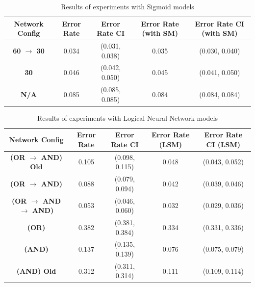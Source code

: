 \begin{table}[H]
	\begin{center}
		\begin{tabular}{| c | c | c | c | c |}
			\hline
			\textbf{Network Config} & \textbf{Error Rate} & \textbf{Error Rate CI} & \textbf{Error Rate (with SM)} & \textbf{Error Rate CI (with SM)}\\
			\hline
			\hline
			\textbf{60 $\rightarrow$ 30} & 0.034 & (0.031, 0.038) & 0.035 & (0.030, 0.040)\\
			\textbf{30} & 0.046 & (0.042, 0.050) & 0.045 & (0.041, 0.050)\\
			\textbf{N/A} & 0.085 & (0.085, 0.085) & 0.084 & (0.084, 0.084)\\
			\hline
		\end{tabular}
	\end{center}
	\caption{Results of experiments with Sigmoid models}
	\label{tab:mnist-sigmoid-peformance-results}
\end{table}

\begin{table}[H]
	\begin{center}
		\begin{tabular}{| c | c | c | c | c |}
			\hline
			\textbf{Network Config} & \textbf{Error Rate} & \textbf{Error Rate CI} & \textbf{Error Rate (LSM)} & \textbf{Error Rate CI (LSM)}\\
			\hline
			\hline
			\textbf{(OR $\rightarrow$ AND) Old } & 0.105 & (0.098, 0.115) & 0.048 & (0.043, 0.052)\\
			\textbf{(OR $\rightarrow$ AND) } & 0.088 & (0.079, 0.094) & 0.042 & (0.039, 0.046)\\
			\textbf{(OR $\rightarrow$ AND $\rightarrow$ AND) } & 0.053 & (0.046, 0.060) & 0.032 & (0.029, 0.036)\\
			\textbf{(OR) } & 0.382 & (0.381, 0.384) & 0.334 & (0.331, 0.336)\\
			\textbf{(AND) } & 0.137 & (0.135, 0.139) & 0.076 & (0.075, 0.079)\\
			\textbf{(AND) Old} & 0.312 & (0.311, 0.314) & 0.111 & (0.109, 0.114)\\
			\hline
		\end{tabular}
	\end{center}
	\caption{Results of experiments with Logical Neural Network models}
	\label{tab:mnist-lnn-peformance-results}
\end{table}

